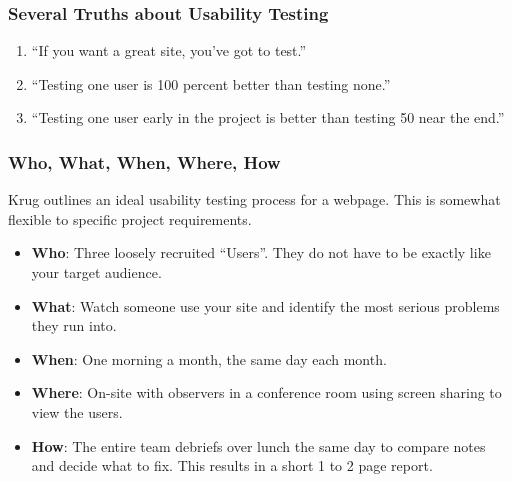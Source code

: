 \documentclass{article}%
\begin{document}
    \subsubsection{Several Truths about Usability Testing}
    \begin{enumerate}
      \item ``If you want a great site, you've got to test.''
      \item ``Testing one user is 100 percent better than testing none.''
      \item ``Testing one user early in the project is better than testing 50 near the end.''
    \end{enumerate}
    \subsubsection{Who, What, When, Where, How}
    Krug outlines an ideal usability testing process for a webpage. This is somewhat
    flexible to specific project requirements.
    \begin{itemize}
      \item \textbf{Who}: Three loosely recruited ``Users''. They do not have to be exactly like your target audience.
      \item \textbf{What}: Watch someone use your site and identify the most serious problems they run into.
      \item \textbf{When}: One morning a month, the same day each month.
      \item \textbf{Where}: On-site with observers in a conference room using screen sharing to view the users.
      \item \textbf{How}: The entire team debriefs over lunch the same day to compare notes and decide what to fix. This results in a short 1 to 2 page report.
    \end{itemize}
\end{document}
